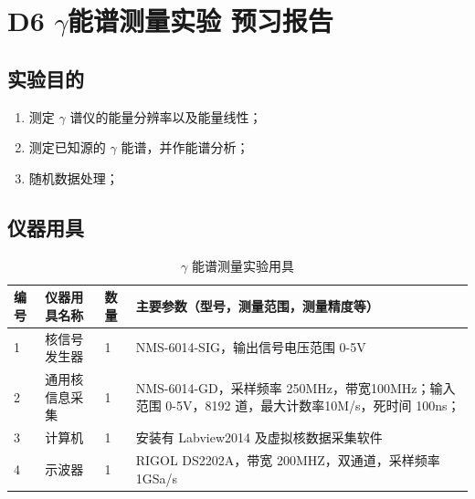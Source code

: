 \documentclass[dvipsnames, svgnames,a4paper,11pt]{article}
\begin{document}
\clearpage
\tableofcontents
\clearpage

\setcounter{section}{0}
\section{D6 \quad $\gamma$能谱测量实验 \quad\heiti 预习报告}
	
\subsection{实验目的}
\begin{enumerate}
	\item 测定 $\gamma$ 谱仪的能量分辨率以及能量线性；
	\item 测定已知源的 $\gamma$ 能谱，并作能谱分析；
	\item 随机数据处理；
	
\end{enumerate}

\subsection{仪器用具}


\begin{table}[htbp]
	\centering
	\renewcommand\arraystretch{1.6}
	\caption{$\gamma$ 能谱测量实验用具}
	\begin{tabular}{p{}|p{}|p{}|p{}}
		\hline
		编号& 仪器用具名称 & 数量 &  主要参数（型号，测量范围，测量精度等） \\
		\hline
		1	&	核信号发生器 	& 1 & NMS-6014-SIG，输出信号电压范围 0-5V	\\

		2	&	通用核信息采集 	& 1 & NMS-6014-GD，采样频率 250MHz，带宽100MHz；输入范围 0-5V，8192 道，最大计数率10M/s，死时间 100ns；	 \\
		
		3	&	计算机 & 1 & 安装有 Labview2014 及虚拟核数据采集软件	 	\\
		
		4	&	示波器	& 1 &  RIGOL DS2202A，带宽 200MHZ，双通道，采样频率 1GSa/s	\\
		
		\hline
	\end{tabular}
	\label{tbl:gamma 能谱测量实验用具}
\end{table}




\end{document}
